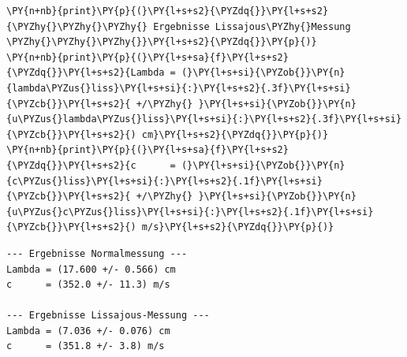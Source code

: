 \begin{tcolorbox}[breakable, size=fbox, boxrule=1pt, pad at break*=1mm,colback=cellbackground, colframe=cellborder]
\begin{Verbatim}[commandchars=\\\{\}]
\PY{n+nb}{print}\PY{p}{(}\PY{l+s+s2}{\PYZdq{}}\PY{l+s+s2}{\PYZhy{}\PYZhy{}\PYZhy{} Ergebnisse Lissajous\PYZhy{}Messung \PYZhy{}\PYZhy{}\PYZhy{}}\PY{l+s+s2}{\PYZdq{}}\PY{p}{)}
\PY{n+nb}{print}\PY{p}{(}\PY{l+s+sa}{f}\PY{l+s+s2}{\PYZdq{}}\PY{l+s+s2}{Lambda = (}\PY{l+s+si}{\PYZob{}}\PY{n}{lambda\PYZus{}liss}\PY{l+s+si}{:}\PY{l+s+s2}{.3f}\PY{l+s+si}{\PYZcb{}}\PY{l+s+s2}{ +/\PYZhy{} }\PY{l+s+si}{\PYZob{}}\PY{n}{u\PYZus{}lambda\PYZus{}liss}\PY{l+s+si}{:}\PY{l+s+s2}{.3f}\PY{l+s+si}{\PYZcb{}}\PY{l+s+s2}{) cm}\PY{l+s+s2}{\PYZdq{}}\PY{p}{)}
\PY{n+nb}{print}\PY{p}{(}\PY{l+s+sa}{f}\PY{l+s+s2}{\PYZdq{}}\PY{l+s+s2}{c      = (}\PY{l+s+si}{\PYZob{}}\PY{n}{c\PYZus{}liss}\PY{l+s+si}{:}\PY{l+s+s2}{.1f}\PY{l+s+si}{\PYZcb{}}\PY{l+s+s2}{ +/\PYZhy{} }\PY{l+s+si}{\PYZob{}}\PY{n}{u\PYZus{}c\PYZus{}liss}\PY{l+s+si}{:}\PY{l+s+s2}{.1f}\PY{l+s+si}{\PYZcb{}}\PY{l+s+s2}{) m/s}\PY{l+s+s2}{\PYZdq{}}\PY{p}{)}
\end{Verbatim}
\end{tcolorbox}

    \begin{Verbatim}[commandchars=\\\{\}]
--- Ergebnisse Normalmessung ---
Lambda = (17.600 +/- 0.566) cm
c      = (352.0 +/- 11.3) m/s

--- Ergebnisse Lissajous-Messung ---
Lambda = (7.036 +/- 0.076) cm
c      = (351.8 +/- 3.8) m/s
    \end{Verbatim}

    \begin{tcolorbox}[breakable, size=fbox, boxrule=1pt, pad at break*=1mm,colback=cellbackground, colframe=cellborder]
\begin{Verbatim}[commandchars=\\\{\}]

\end{Verbatim}
\end{tcolorbox}


    
